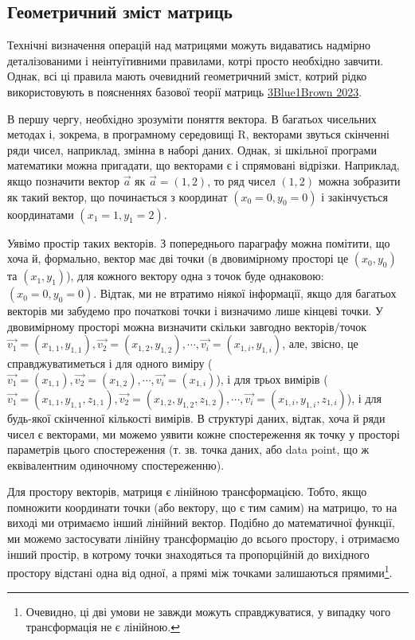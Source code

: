 \documentclass[
  11pt,
]{book}
\begin{document}
\subsection{Геометричний зміст матриць}\label{matrices_art}

Технічні визначення операцій над матрицями можуть видаватись надмірно деталізованими і неінтуїтивними правилами, котрі просто необхідно завчити. Однак, всі ці правила мають очевидний геометричний зміст, котрий рідко використовують в поясненнях базової теорії матриць \href{https://youtube.com/playlist?list=PLZHQObOWTQDPD3MizzM2xVFitgF8hE_ab}{3Blue1Brown 2023}.

В першу чергу, необхідно зрозуміти поняття вектора. В багатьох чисельних методах і, зокрема, в програмному середовищі R, векторами звуться скінченні ряди чисел, наприклад, змінна в наборі даних. Однак, зі шкільної програми математики можна пригадати, що векторами є і спрямовані відрізки. Наприклад, якщо позначити вектор \(\vec{a}\) як \(\vec{a} = (1, 2)\), то ряд чисел \((1, 2)\) можна зобразити як такий вектор, що починається з координат \((x_0 = 0, y_0 = 0)\) і закінчується координатами \((x_1 = 1, y_1 = 2)\).

Уявімо простір таких векторів. З попереднього параграфу можна помітити, що хоча й, формально, вектор має дві точки (в двовимірному просторі це \((x_0, y_0)\) та \((x_1, y_1)\)), для кожного вектору одна з точок буде однаковою: \((x_0 = 0, y_0 = 0)\). Відтак, ми не втратимо ніякої інформації, якщо для багатьох векторів ми забудемо про початкові точки і визначимо лише кінцеві точки. У двовимірному просторі можна визначити скільки завгодно векторів/точок \(\vec{v_1} = (x_{1, 1}, y_{1, 1}), \vec{v_2} = (x_{1, 2}, y_{1, 2}), \cdots, \vec{v_i} = (x_{1, i}, y_{1, i})\), але, звісно, це справджуватиметься і для одного виміру (\(\vec{v_1} = (x_{1, 1}), \vec{v_2} = (x_{1, 2}), \cdots, \vec{v_i} = (x_{1, i})\)), і для трьох вимірів (\(\vec{v_1} = (x_{1, 1}, y_{1, 1}, z_{1, 1}), \vec{v_2} = (x_{1, 2}, y_{1, 2}, z_{1, 2}), \cdots, \vec{v_i} = (x_{1, i}, y_{1, i}, z_{1, i})\)), і для будь-якої скінченної кількості вимірів. В структурі даних, відтак, хоча й ряди чисел є векторами, ми можемо уявити кожне спостереження як точку у просторі параметрів цього спостереження (т. зв. точка даних, або data point, що ж еквівалентним одиночному спостереженню).

Для простору векторів, матриця є лінійною трансформацією. Тобто, якщо помножити координати точки (або вектору, що є тим самим) на матрицю, то на виході ми отримаємо інший лінійний вектор. Подібно до математичної функції, ми можемо застосувати лінійну трансформацію до всього простору, і отримаємо інший простір, в котрому точки знаходяться та пропорційній до вихідного простору відстані одна від одної, а прямі між точками залишаються прямими\footnote{Очевидно, ці дві умови не завжди можуть справджуватися, у випадку чого трансформація не є лінійною.}.
\end{document}
